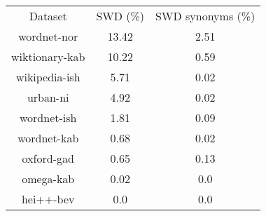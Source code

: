 \begin{tabular}{ccc}
Dataset & SWD (\%) & SWD synonyms (\%)\\
wordnet-nor & 13.42 & 2.51\\
wiktionary-kab & 10.22 & 0.59\\
wikipedia-ish & 5.71 & 0.02\\
urban-ni & 4.92 & 0.02\\
wordnet-ish & 1.81 & 0.09\\
wordnet-kab & 0.68 & 0.02\\
oxford-gad & 0.65 & 0.13\\
omega-kab & 0.02 & 0.0\\
hei++-bev & 0.0 & 0.0\\
\end{tabular}
